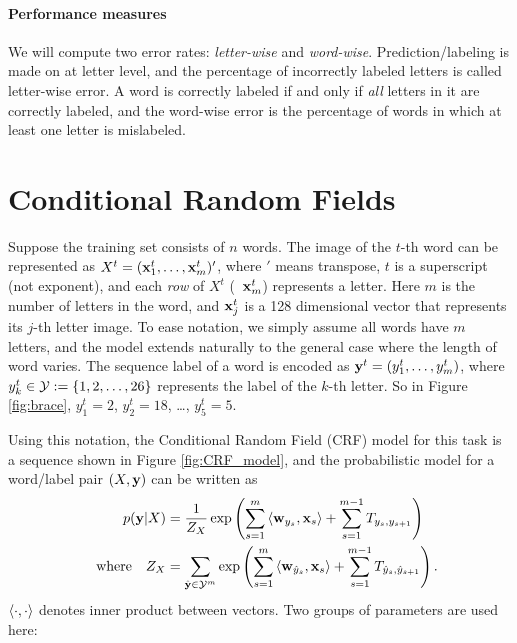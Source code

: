 \documentclass[11pt]{report}
\begin{document}
	
	\paragraph{Performance measures}
	We will compute two error rates: \emph{letter-wise} and \emph{word-wise}.
	Prediction/labeling is made on at letter level,
	and the percentage of incorrectly labeled letters is called letter-wise error.
	A word is correctly labeled if and only if \emph{all} letters in it are correctly labeled,
	and the word-wise error is the percentage of words in which at least one letter is mislabeled.
	
	
	\section{Conditional Random Fields}
	
	Suppose the training set consists of $n$ words.
	The image of the $t$-th word can be represented as
	$X^t = (\mathbf{\boldsymbol{x}}^t_1, \ldots, \mathbf{\boldsymbol{x}}^t_m)'$,
	where $'$ means transpose,
	$t$ is a superscript (not exponent),
	and each \emph{row} of $X^t$ (\eg\ $\mathbf{\boldsymbol{x}}^t_m$) represents a letter.
	Here $m$ is the number of letters in the word,
	and $\mathbf{\boldsymbol{x}}^t_j$ is a 128 dimensional vector that represents its $j$-th letter image.
	To ease notation, we simply assume all words have $m$ letters,
	and the model extends naturally to the general case where the length of word varies.
	The sequence label of a word is encoded as
	$\mathbf{\boldsymbol{y}}^t = (y^t_1, \ldots, y^t_m)$,
	where $y^t_k \in \mathcal{Y} := \{1, 2, \ldots, 26\}$ represents the label of the $k$-th letter.
	So in Figure \ref{fig:brace}, $y^t_1 = 2$, $y^t_2 = 18$, \ldots, $y^t_5 = 5$.
	
	Using this notation, the Conditional Random Field (CRF) model for this task is a sequence shown in Figure \ref{fig:CRF_model},
	and the probabilistic model for a word/label pair $(X, \mathbf{\boldsymbol{y}})$ can be written as
	\begin{align}
	\label{eq:crf}
	p(\mathbf{\boldsymbol{y}} | X ) &= \frac{1}{Z_X} \exp \left(\sum_{s=1}^m \left\langle \mathbf{\boldsymbol{w}}_{y_s},\mathbf{\boldsymbol{x}}_s \right\rangle + \sum_{s=1}^{m-1} T_{y_s, y_{s+1}}\right) \\
	{\quad \text{where} \quad} Z_X &= \sum_{\hat{\mathbf{\boldsymbol{y}}} \in \mathcal{Y}^m} \exp \left(\sum_{s=1}^m \left\langle \mathbf{\boldsymbol{w}}_{\hat{y}_s},\mathbf{\boldsymbol{x}}_s \right\rangle + \sum_{s=1}^{m-1} T_{\hat{y}_s, \hat{y}_{s+1}}\right).
	\end{align}
	$\left\langle \cdot,\cdot \right\rangle$ denotes inner product between vectors.
	Two groups of parameters are used here:
	
\end{document}

